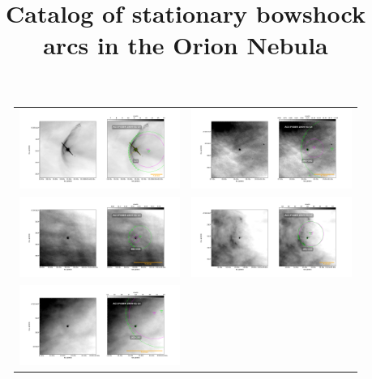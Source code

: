 \documentclass{article}
\title{Catalog of stationary bowshock arcs in the Orion Nebula}
\begin{document}
\maketitle

\begin{figure}[htp]
\centering
\begin{tabular}{l l}
   \includegraphics[width=0.7\linewidth]{j8oc01010_wcs/LL1-Bally_01-images.pdf}

  & \includegraphics[width=0.7\linewidth]{j8oc01010_wcs/065-502-Bally_01-images.pdf}
\\
   \includegraphics[width=0.7\linewidth]{j8oc01010_wcs/083-435-Bally_01-images.pdf}

   &\includegraphics[width=0.7\linewidth]{j8oc01010_wcs/101-233-Bally_01-images.pdf}
\\
   \includegraphics[width=0.7\linewidth]{j8oc01010_wcs/102-157-Bally_01-images.pdf}


\end{tabular}
\end{figure}
\end{document}

